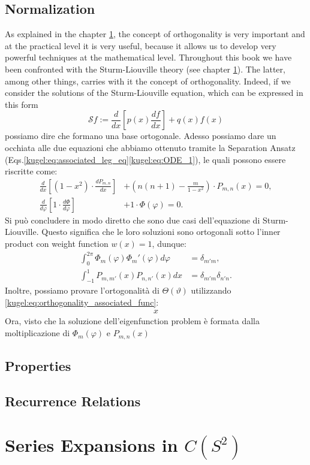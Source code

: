 \subsection{Normalization}
As explained in the chapter \ref{}, the concept of orthogonality is very important and at the practical level it is very useful, because it allows us to develop very powerful techniques at the mathematical level.\newline 
Throughout this book we have been confronted with the Sturm-Liouville theory (see chapter \ref{}). The latter, among other things, carries with it the concept of orthogonality. Indeed, if we consider the solutions of the Sturm-Liouville equation, which can be expressed in this form
\begin{equation}\label{kugel:eq:sturm_liouville}
    \mathcal{S}f := \frac{d}{dx}\left[p(x)\frac{df}{dx}\right]+q(x)f(x)
\end{equation}
possiamo dire che formano una base ortogonale.\newline
Adesso possiamo dare un occhiata alle due equazioni che abbiamo ottenuto tramite la Separation Ansatz (Eqs.\eqref{kugel:eq:associated_leg_eq}\eqref{kugel:eq:ODE_1}), le quali possono essere riscritte come:
\begin{align*}
    \frac{d}{dx} \left[ (1-x^2) \cdot \frac{dP_{m,n}}{dx} \right] &+ \left(n(n+1)-\frac{m}{1-x^2} \right) \cdot P_{m,n}(x) = 0, \\
    \frac{d}{d\varphi} \left[ 1 \cdot \frac{ d\Phi }{d\varphi} \right] &+ 1 \cdot \Phi(\varphi) = 0. 
\end{align*}
Si può concludere in modo diretto che sono due casi dell'equazione di Sturm-Liouville. Questo significa che le loro soluzioni sono ortogonali sotto l'inner product con weight function $w(x)=1$, dunque:
\begin{align}
\int_{0}^{2\pi} \Phi_m(\varphi)\Phi_m'(\varphi) d\varphi &= \delta_{m'm}, \nonumber \\
\int_{-1}^1 P_{m,m'}(x)P_{n,n'}(x) dx &= \delta_{m'm}\delta_{n'n}. \label{kugel:eq:orthogonality_associated_func}
\end{align}
Inoltre, possiamo provare l'ortogonalità di $\Theta(\vartheta)$ utilizzando \eqref{kugel:eq:orthogonality_associated_func}:
\begin{align}
    x
\end{align}
Ora, visto che la soluzione dell'eigenfunction problem è formata dalla moltiplicazione di $\Phi_m(\varphi)$ e $P_{m,n}(x)$
\begin{lemma}

\end{lemma}
\subsection{Properties}

\subsection{Recurrence Relations}

\section{Series Expansions in \(C(S^2)\)}

\nocite{olver_introduction_2013}
